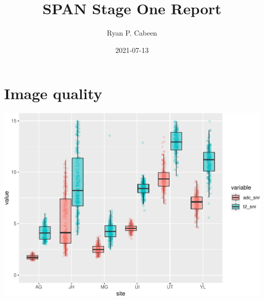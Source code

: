 \documentclass[
]{article}
\title{SPAN Stage One Report}
\author{Ryan P. Cabeen}
\date{2021-07-13}
\begin{document}
\maketitle

\newpage

\hypertarget{image-quality}{%
\section{Image quality}\label{image-quality}}

\begin{center}\includegraphics{paper_files/figure-latex/plot_snr-1} \end{center}
\end{document}

